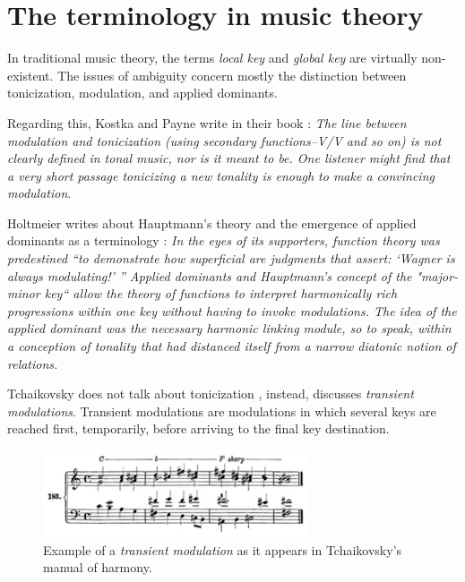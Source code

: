 \section{The terminology in music theory}

In traditional music theory, the terms \emph{local key} and \emph{global key} are virtually non-existent. The issues of ambiguity concern mostly the distinction between tonicization, modulation, and applied dominants.

Regarding this, Kostka and Payne write in their book \cite{kostka_tonal_2018}: \emph{The line between modulation and tonicization (using secondary functions--V/V and so on) is not clearly defined in tonal music, nor is it meant to be. One listener might find that a very short passage tonicizing a new tonality is enough to make a convincing modulation}.

Holtmeier writes about Hauptmann’s theory and the emergence of applied dominants as a terminology \cite{gollin_reception_2012}: \emph{In the eyes of its supporters, function theory was predestined ``to demonstrate how superficial are judgments that assert: `Wagner is always modulating!' '' Applied dominants and Hauptmann's concept of the "major-minor key“ allow the theory of functions to interpret harmonically rich progressions within one key without having to invoke modulations. The idea of the applied dominant was the necessary harmonic linking module, so to speak, within a conception of tonality that had distanced itself from a narrow diatonic notion of relations.}

Tchaikovsky does not talk about tonicization \cite{tchaikovsky_guide_2005}, instead, discusses \emph{transient modulations}. Transient modulations are modulations in which several keys are reached first, temporarily, before arriving to the final key destination.

\begin{figure}[h]
    \centering
    \includegraphics[width=0.7\textwidth]{figures/Q6_2.png}
    \caption{Example of a \emph{transient modulation} as it appears in Tchaikovsky's manual of harmony.}
    \label{fig:Q6_2}
\end{figure}

